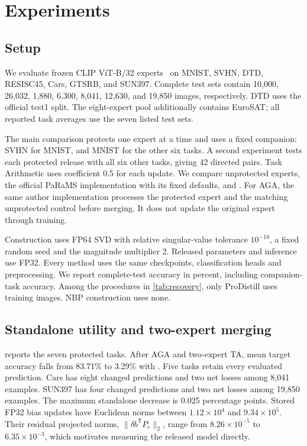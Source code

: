 \section{Experiments}
\label{sec:experiments}
\subsection{Setup}
We evaluate frozen CLIP ViT-B/32 experts~\cite{radford2021clip} on MNIST, SVHN, DTD, RESISC45, Cars, GTSRB, and SUN397. Complete test sets contain 10,000, 26,032, 1,880, 6,300, 8,041, 12,630, and 19,850 images, respectively. DTD uses the official test1 split. The eight-expert pool additionally contains EuroSAT; all reported task averages use the seven listed test sets.

The main comparison protects one expert at a time and uses a fixed companion: SVHN for MNIST, and MNIST for the other six tasks. A second experiment tests each protected release with all six other tasks, giving 42 directed pairs. Task Arithmetic uses coefficient 0.5 for each update. We compare unprotected experts, the official PaRaMS implementation with its fixed defaults, and \method. For AGA, the same author implementation processes the protected expert and the matching unprotected control before merging. It does not update the original expert through training.

Construction uses FP64 SVD with relative singular-value tolerance $10^{-10}$, a fixed random seed and the magnitude multiplier 2. Released parameters and inference use FP32. Every method uses the same checkpoints, classification heads and preprocessing. We report complete-test accuracy in percent, including companion-task accuracy. Among the procedures in \cref{tab:recovery}, only ProDistill uses training images. NBP construction uses none.

\subsection{Standalone utility and two-expert merging}
 reports the seven protected tasks. After AGA and two-expert TA, mean target accuracy falls from 83.71\% to 3.29\% with \method{}. Five tasks retain every evaluated prediction. Cars has eight changed predictions and two net losses among 8,041 examples. SUN397 has four changed predictions and two net losses among 19,850 examples. The maximum standalone decrease is 0.025 percentage points. Stored FP32 bias updates have Euclidean norms between $1.12\times10^4$ and $9.34\times10^5$. Their residual projected norms, $\|\delta b^{\mathsf T}P_e\|_2$, range from $8.26\times10^{-5}$ to $6.35\times10^{-3}$, which motivates measuring the released model directly.

